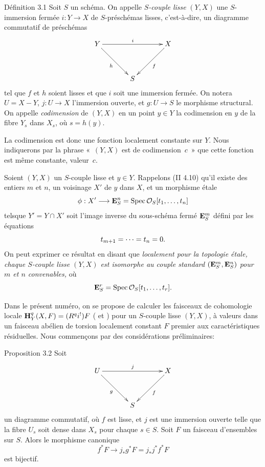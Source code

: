 \documentclass[10pt]{../fichiers-configuration-latex/smfart}
\begin{document}
\begin{enonce*}{Définition 3.1}
Soit $S$ un schéma. On appelle \emph{$S$-couple lisse} $(Y,X)$ une
$S$-immersion fermée $i:Y\rightarrow X$ de $S$-préschémas lisses,
c'est-à-dire, un diagramme commutatif de préschémas
$$
\xymatrix@=1.25cm{
Y \ar[rr]^{i} \ar[rd]_{h}&     &X\ar[ld]^{f}\\
  & S   &
}
$$
tel que $f$ et $h$ soient lisses et que $i$ soit une immersion
fermée. On notera $U=X-Y$, $j:U\rightarrow X$ l'immersion ouverte, et
$g:U\rightarrow S$ le morphisme structural. On appelle
\emph{codimension} de $(Y,X)$ en un point $y\in Y$ la codimension en
$y$ de la fibre $Y_s$ dans $X_s$, où $s=h(y)$.
\end{enonce*}

La codimension est donc une fonction localement constante sur
$Y$. Nous indiquerons par la phrase « $(Y,X)$ est de
codimension~$c$ » que cette fonction est même constante,  valeur~$c$. %

Soient $(Y,X)$ un $S$-couple lisse et $y\in Y$. Rappelons (\SGA II
4.10) qu'il existe des entiers $m$ et $n$, un voisinage $X'$ de $y$
dans $X$, et un morphisme étale
$$
\phi:X'\longrightarrow \mathbf{E}^n_S=\operatorname{Spec} {\mathcal O}_S[t_1,\dots,t_n]
$$
tels\pageoriginale que $Y'=Y\cap X'$ soit l'image inverse du
sous-schéma fermé $\mathbf{E}^m_S$ défini par les équations
$$
t_{m+1}=\dots=t_n=0{}.
$$
On peut exprimer ce résultat en disant que \emph{localement pour la
  topologie étale, chaque $S$-couple lisse $(Y,X)$ est isomorphe au
  couple standard $(\mathbf{E}^m_S, \mathbf{E}^n_S)$ pour $m$ et $n$
  convenables,} où
$$
\mathbf{E}^r_S=\operatorname{Spec} {\mathcal O}_S[t_1,\dots,t_r]{}.
$$

Dans le présent numéro, on se propose de calculer les faisceaux de
cohomologie locale $\mathbf{H}^q_Y(X,F)=(R^{q}i^{!})F$ ( et )
pour un $S$-couple lisse $(Y,X)$, à valeurs dans un faisceau abélien de
torsion localement constant $F$ premier aux caractéristiques
résiduelles. Nous commençons par des considérations préliminaires:

\begin{enonce*}{Proposition 3.2}
Soit
$$
\xymatrix@=1.25cm{
U \ar[rr]^{j} \ar[rd]_{g}&     &X\ar[ld]^{f}\\
  & S   &
}
$$
un diagramme commutatif, où $f$ est lisse, et $j$ est une immersion
ouverte telle que la fibre $U_s$ soit dense dans $X_s$ pour chaque
$s\in S$. Soit $F$ un faisceau d'ensembles sur $S$. Alors le morphisme
canonique
$$
f^{\ast}F\longrightarrow j_{\ast}g^{\ast}F=j_{\ast}j^{\ast}f^{\ast}F
$$
est bijectif.
\end{enonce*}
\end{document}
